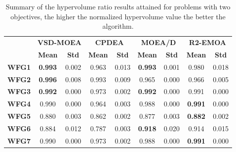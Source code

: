 \begin{table*}[t]
\caption{Summary of the hypervolume ratio results attained for problems with two objectives, the higher the normalized hypervolume value the better the algorithm.}
\label{tab:StatisticsHV_2obj}
\begin{tabular}{cc|c|c|c|c|c|c|c}
\cline{2-9}
\textbf{}                           & \multicolumn{2}{c|}{\textbf{VSD-MOEA}}              & \multicolumn{2}{c|}{\textbf{CPDEA}} & \multicolumn{2}{c|}{\textbf{MOEA/D}} & \multicolumn{2}{c}{\textbf{R2-EMOA}} \\ \cline{2-9} 
\textbf{}                           & \multicolumn{1}{c|}{\textbf{Mean}}  & \textbf{Std} & \textbf{Mean}     & \textbf{Std}    & \textbf{Mean}      & \textbf{Std}    & \textbf{Mean}      & \textbf{Std}     \\ \hline
\multicolumn{1}{c|}{\textbf{WFG1}}  & \multicolumn{1}{c|}{\textbf{0.993}} & 0.002        & 0.963             & 0.013           & \textbf{0.993}     & 0.001           & 0.980              & 0.018            \\ \hline
\multicolumn{1}{c|}{\textbf{WFG2}}  & \multicolumn{1}{c|}{\textbf{0.996}} & 0.008        & 0.993             & 0.009           & 0.965              & 0.000           & 0.966              & 0.005            \\ \hline
\multicolumn{1}{c|}{\textbf{WFG3}}  & \multicolumn{1}{c|}{\textbf{0.992}} & 0.000        & 0.973             & 0.002           & \textbf{0.992}     & 0.000           & 0.991              & 0.000            \\ \hline
\multicolumn{1}{c|}{\textbf{WFG4}}  & \multicolumn{1}{c|}{0.990}          & 0.000        & 0.964             & 0.003           & 0.988              & 0.000           & \textbf{0.991}     & 0.000            \\ \hline
\multicolumn{1}{c|}{\textbf{WFG5}}  & \multicolumn{1}{c|}{0.880}          & 0.003        & 0.862             & 0.002           & 0.877              & 0.003           & \textbf{0.882}     & 0.002            \\ \hline
\multicolumn{1}{c|}{\textbf{WFG6}}  & \multicolumn{1}{c|}{0.884}          & 0.012        & 0.787             & 0.003           & \textbf{0.918}     & 0.020           & 0.914              & 0.015            \\ \hline
\multicolumn{1}{c|}{\textbf{WFG7}}  & \multicolumn{1}{c|}{0.990}          & 0.000        & 0.973             & 0.002           & 0.988              & 0.000           & \textbf{0.991}     & 0.000            \\ \hline

\end{tabular}
\end{table*}
